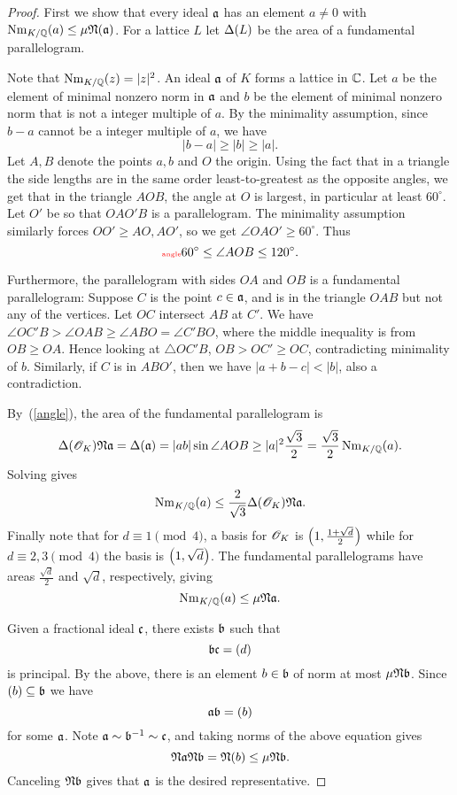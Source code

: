 \begin{proof}
First we show that every ideal $\mathfrak{a}$ has an element $a\ne 0$ with $\operatorname{Nm}_{K/\mathbb{Q}}(a)\le\mu\mathfrak N(\mathfrak{a})$. For a lattice $L$ let $\Delta(L)$ be the area of a fundamental parallelogram.

Note that $\operatorname{Nm}_{K/\mathbb{Q}}(z)=|z|^2$. An ideal $\mathfrak{a}$ of $K$ forms a lattice in $\mathbb{C}$. Let $a$ be the element of minimal nonzero norm in $\mathfrak{a}$ and $b$ be the element of minimal nonzero norm that is not a integer multiple of $a$. By the minimality assumption, since $b-a$ cannot be a integer multiple of $a$, we have
\[
|b-a|\ge|b|\ge|a|.
\] 
Let $A,B$ denote the points $a,b$ and $O$ the origin.
Using the fact that in a triangle the side lengths are in the  same order least-to-greatest as the opposite angles, 
we get that in the triangle $AOB$, the angle at $O$ is largest, in particular at least $60^{\circ}$. Let $O'$ be so that $OAO'B$ is a parallelogram. %
The minimality assumption similarly forces $OO'\ge AO,AO'$, so we get $\angle OAO'\ge 60^{\circ}$. Thus
\begin{equation}
\llabel{angle}
60^{\circ}\le\angle AOB\le 120^{\circ}.
\end{equation}

Furthermore, the parallelogram with sides $OA$ and $OB$ is a fundamental parallelogram: Suppose $C$ is the point $c\in \mathfrak{a}$, and is in the triangle $OAB$ but not any of the vertices. Let $OC$ intersect $AB$ at $C'$. We have $\angle OC'B> \angle OAB\ge\angle ABO=\angle C'BO$, where the middle inequality is from $OB\ge OA$. Hence looking at $\triangle OC'B$, $OB> OC'\ge OC$, contradicting minimality of $b$. Similarly, if $C$ is in $ABO'$, then we have $|a+b-c|<|b|$, also a contradiction.

By~(\ref{angle}), the area of the fundamental parallelogram is
\[
\Delta(\mathscr{O}_K)\mathfrak N\mathfrak{a}=\Delta(\mathfrak{a})=|ab|\sin \angle AOB\ge  |a|^2 \frac{\sqrt3} 2 =\frac{\sqrt3}2\operatorname{Nm}_{K/\mathbb{Q}}(a).
\]
Solving gives
\[
\operatorname{Nm}_{K/\mathbb{Q}}(a)\le \frac{2}{\sqrt3} \Delta(\mathscr{O}_K)\mathfrak N \mathfrak{a}.
\]
Finally note that for $d\equiv 1\pmod 4$, a basis for $\mathscr{O}_K$ is $\left( {1,\frac{1+\sqrt d}2} \right)$ while for $d\equiv 2,3\pmod 4$ the basis is $\left( {1,\sqrt d} \right)$. The fundamental parallelograms have areas $\frac{\sqrt d}2$ and $\sqrt d$, respectively, giving
\[
\operatorname{Nm}_{K/\mathbb{Q}}(a)\le \mu\mathfrak N\mathfrak{a}.
\]

Given a fractional ideal $\mathfrak{c}$, there exists $\mathfrak{b}$ such that
\[
\mathfrak{b}\mathfrak{c}=(d)
\]
is principal. 
By the above, there is an element $b\in \mathfrak{b}$ of norm at most $\mu\mathfrak N\mathfrak{b}$. Since $(b)\subseteq \mathfrak{b}$ we have
\[
\mathfrak{a}\mathfrak{b}=(b)
\]
for some $\mathfrak{a}$. Note $\mathfrak{a}\sim \mathfrak{b}^{-1}\sim \mathfrak{c}$, and taking norms of the above equation gives
\[
\mathfrak N\mathfrak{a}\mathfrak N\mathfrak{b}=\mathfrak N(b)\le \mu \mathfrak N\mathfrak{b}.
\]
Canceling $\mathfrak N\mathfrak{b}$ gives that $\mathfrak{a}$ is the desired representative.
\end{proof}


